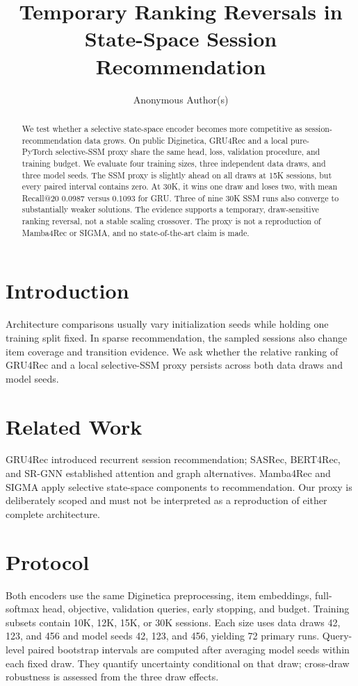 \documentclass[runningheads]{llncs}
\begin{document}
\title{Temporary Ranking Reversals in State-Space Session Recommendation}
\author{Anonymous Author(s)}
\maketitle

\begin{abstract}
We test whether a selective state-space encoder becomes more competitive as
session-recommendation data grows. On public Diginetica, GRU4Rec and a local
pure-PyTorch selective-SSM proxy share the same head, loss, validation
procedure, and training budget. We evaluate four training sizes, three
independent data draws, and three model seeds. The SSM proxy is slightly ahead
on all draws at 15K sessions, but every paired interval contains zero. At 30K,
it wins one draw and loses two, with mean Recall@20 0.0987 versus 0.1093 for
GRU. Three of nine 30K SSM runs also converge to substantially weaker
solutions. The evidence supports a temporary, draw-sensitive ranking reversal,
not a stable scaling crossover. The proxy is not a reproduction of Mamba4Rec
or SIGMA, and no state-of-the-art claim is made.
\end{abstract}

\section{Introduction}
Architecture comparisons usually vary initialization seeds while holding one
training split fixed. In sparse recommendation, the sampled sessions also
change item coverage and transition evidence. We ask whether the relative
ranking of GRU4Rec and a local selective-SSM proxy persists across both data
draws and model seeds.

\section{Related Work}
GRU4Rec introduced recurrent session recommendation; SASRec, BERT4Rec, and
SR-GNN established attention and graph alternatives. Mamba4Rec and SIGMA apply
selective state-space components to recommendation. Our proxy is deliberately
scoped and must not be interpreted as a reproduction of either complete
architecture.

\section{Protocol}
Both encoders use the same Diginetica preprocessing, item embeddings,
full-softmax head, objective, validation queries, early stopping, and budget.
Training subsets contain 10K, 12K, 15K, or 30K sessions. Each size uses data
draws 42, 123, and 456 and model seeds 42, 123, and 456, yielding 72 primary
runs. Query-level paired bootstrap intervals are computed after averaging
model seeds within each fixed draw. They quantify uncertainty conditional on
that draw; cross-draw robustness is assessed from the three draw effects.
\end{document}

